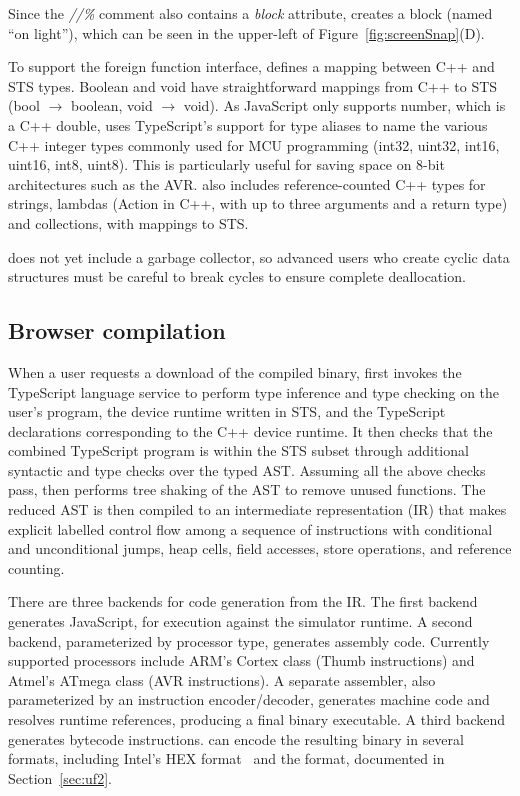 Since the \emph{//\%} comment also contains a \emph{block} attribute, \MC creates a block (named ``on light''), which can be seen in the upper-left of Figure~\ref{fig:screenSnap}(D).

To support the foreign function interface, \MC defines a mapping between C++ and STS types.
Boolean and void have straightforward mappings from C++ to STS (bool $\rightarrow$ boolean, void $\rightarrow$ void).
As JavaScript only supports number, which is a C++ double, \MC uses TypeScript's support
for type aliases to name the various C++ integer types commonly used for MCU programming
(int32, uint32, int16, uint16, int8, uint8).
This is particularly useful for saving space on 8-bit architectures such as the AVR.
\MC also includes reference-counted C++ types for strings, lambdas (Action in C++, with
up to three arguments and a return type) and collections, with mappings to STS.

\MC does not yet include a garbage collector, so advanced users who create cyclic
data structures must be careful to break cycles to ensure complete deallocation.

\subsection{Browser compilation}

When a user requests a download of the compiled binary, \MC first invokes the TypeScript language service to perform type inference and type checking on the
user's program, the device runtime written in STS, and the TypeScript declarations
corresponding to the C++ device runtime. It then checks that the
combined TypeScript program is within the STS subset through additional syntactic and type checks over the typed AST.  Assuming all the
above checks pass, \MC then performs tree shaking of the AST to remove unused functions.
The reduced AST is then compiled to an intermediate representation (IR) that makes explicit labelled control
flow among a sequence of instructions with conditional and unconditional jumps, heap cells, field accesses, store operations, and reference counting.

There are three backends for code generation from the IR. The first backend generates JavaScript, for execution against the simulator runtime.  A second backend, parameterized by processor type, generates assembly code. Currently supported processors include ARM's Cortex class (Thumb instructions) and Atmel's ATmega class (AVR instructions). A separate assembler, also parameterized by an instruction encoder/decoder, generates machine code and resolves runtime references, producing a final binary executable. A third backend generates bytecode instructions. \MC can encode the resulting binary in several formats, including Intel's HEX format~\cite{IntelHEX} and the \UF format, documented in Section~\ref{sec:uf2}.


